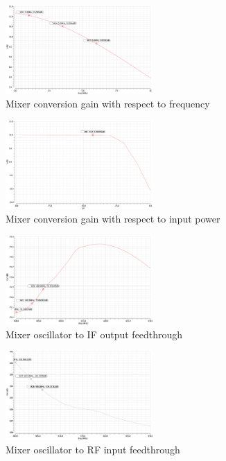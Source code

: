 \begin{figure}[h]
   \centering
    \includegraphics[width=0.5\textwidth]{figures/MixerConversionGainFreq.png}
    \caption{Mixer conversion gain with respect to frequency}
    \label{fig:cgfreq}
\end{figure}

\begin{figure}[h]
   \centering
    \includegraphics[width=0.5\textwidth]{figures/MixerConversionGain.png}
    \caption{Mixer conversion gain with respect to input power}
    \label{fig:cgpwr}
\end{figure}


\begin{figure}[h]
   \centering
    \includegraphics[width=0.5\textwidth]{figures/MixerLO-IFfeed.png}
    \caption{Mixer oscillator to IF output feedthrough}
    \label{fig:loif}
\end{figure}

\begin{figure}[h]
   \centering
    \includegraphics[width=0.5\textwidth]{figures/MixerLO-RFfeed.png}
    \caption{Mixer oscillator to RF input feedthrough}
    \label{fig:lorf}
\end{figure}

